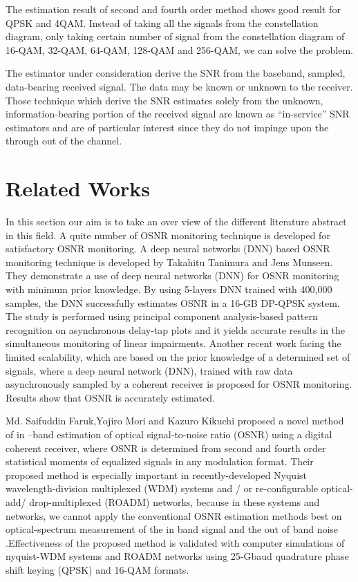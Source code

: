 \documentclass[12pt]{report}
\begin{document}
	The estimation result of second and fourth order method shows good result for QPSK and 4QAM. Instead of taking all the signals from the constellation diagram, only taking certain number of signal from the constellation diagram of 16-QAM, 32-QAM, 64-QAM, 128-QAM and 256-QAM, we can solve the problem. 
	
	
	The estimator under consideration derive the SNR from the baseband, sampled, data-bearing received signal. The data may be known or unknown to the receiver. Those technique which derive the SNR estimates solely from the unknown, information-bearing portion of the received signal are known as “in-service” SNR estimators and are of particular interest since they do not impinge upon the through out of the channel.
	\section{Related Works }
	In this section our aim is to take an over view of the different literature abstract in this field. 
	A quite number of OSNR monitoring technique is developed for satisfactory OSNR monitoring. A deep neural networks (DNN) based OSNR monitoring technique is developed by Takahitu Tanimura and Jens Munseen. 
	They demonstrate a use of deep neural networks (DNN) for OSNR monitoring with minimum prior knowledge. By using 5-layers DNN trained with 400,000 samples, the DNN successfully estimates OSNR in a 16-GB DP-QPSK system. 
	The study is performed using principal component analysis-based pattern recognition on asynchronous delay-tap plots and it yields accurate results in the simultaneous monitoring of linear impairments. Another recent work facing the limited scalability, which are based on the prior knowledge of a determined set of signals, where a deep neural network (DNN), trained with raw data asynchronously sampled by a coherent receiver is proposed for OSNR monitoring. Results show that OSNR is accurately estimated.
	
	Md. Saifuddin Faruk,Yojiro Mori and Kazuro Kikuchi proposed a novel method of in –band estimation of optical signal-to-noise ratio (OSNR) using a digital coherent receiver, where  OSNR is determined from second and fourth order statistical moments of equalized signals in any modulation format. Their proposed method is especially important in recently-developed Nyquist wavelength-division multiplexed (WDM) systems and / or re-configurable optical-add/ drop-multiplexed (ROADM) networks, because in these systems and networks, we cannot apply the conventional OSNR estimation methods best on optical-spectrum measurement of the in band signal and the out of band noise .Effectiveness of the proposed method is validated with computer simulations of nyquist-WDM systems and ROADM networks using 25-Gbaud quadrature phase shift keying (QPSK) and 16-QAM formats.
	
\end{document}
